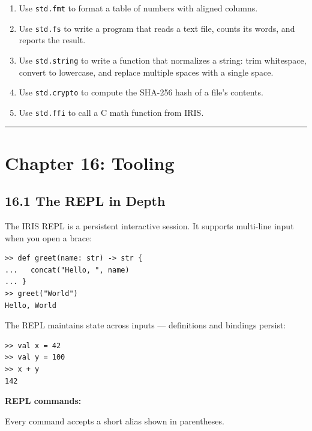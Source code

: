 \documentclass[
  english,
]{book}
\providecommand{\tightlist}{%
  \setlength{\itemsep}{0pt}\setlength{\parskip}{0pt}}
\begin{document}
\begin{enumerate}
\def\labelenumi{\arabic{enumi}.}
\tightlist
\item
  Use \texttt{std.fmt} to format a table of numbers with aligned
  columns.
\item
  Use \texttt{std.fs} to write a program that reads a text file, counts
  its words, and reports the result.
\item
  Use \texttt{std.string} to write a function that normalizes a string:
  trim whitespace, convert to lowercase, and replace multiple spaces
  with a single space.
\item
  Use \texttt{std.crypto} to compute the SHA-256 hash of a file's
  contents.
\item
  Use \texttt{std.ffi} to call a C math function from IRIS.
\end{enumerate}

\begin{center}\rule{0.5\linewidth}{0.5pt}\end{center}

\section{Chapter 16: Tooling}\label{chapter-16-tooling}

\subsection{16.1 The REPL in Depth}\label{the-repl-in-depth}

The IRIS REPL is a persistent interactive session. It supports
multi-line input when you open a brace:

\begin{verbatim}
>> def greet(name: str) -> str {
...   concat("Hello, ", name)
... }
>> greet("World")
Hello, World
\end{verbatim}

The REPL maintains state across inputs --- definitions and bindings
persist:

\begin{verbatim}
>> val x = 42
>> val y = 100
>> x + y
142
\end{verbatim}

\textbf{REPL commands:}

Every command accepts a short alias shown in parentheses.
\end{document}
